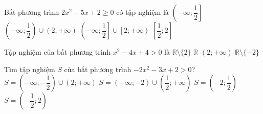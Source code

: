 \begin{ex}%
	Bất phương trình $2x^2-5x+2\geq 0$ có tập  nghiệm là
	 \choice
		 {$\left(-\infty;\dfrac{1}{2} \right]$}
		{$\left(-\infty;\dfrac{1}{2}\right)\cup  \left(2;+\infty \right)$}
		{\True  $\left(-\infty;\dfrac{1}{2}\right]\cup \left[2;+\infty \right)$}
		{$\left[\dfrac{1}{2};2\right]$} 
	 \loigiai{
		Ta có $2x^2-5x+2\geq 0\Leftrightarrow\hoac{&x\geq2\\&x\leq \dfrac{1}{2}.}$\\ Vậy tập nghiệm của phương trình là $S=\left(-\infty;\dfrac{1}{2}\right]\cup \left[2;+\infty  \right)$.
	 }
\end{ex}

\begin{ex}%
	Tập nghiệm của bất phương trình $x^2-4  x+4>0$ là
	\choice 
		{\True $\mathbb{R} \setminus\{2\}$} 
		{$\mathbb{R}$} 
		{$(2;+\infty)$} 
		{$\mathbb{R} \setminus\{-2\}$} 
\end{ex}

\begin{ex}%
	Tìm tập  nghiệm $S$ của bất phương trình $-2x^{2}-3x+2>0$?\\
	\choice 
		{$S=\left(-\infty;-\dfrac{1}{2}\right)\cup(2;+\infty)$} 
		{$S=(-\infty;-2)\cup\left(\dfrac{1}{2};+\infty\right)$} 
		{\True $S=\left(-2;\dfrac{1}{2}\right)$} 
		{$S=\left(-\dfrac{1}{2};2\right)$} 
\end{ex}

